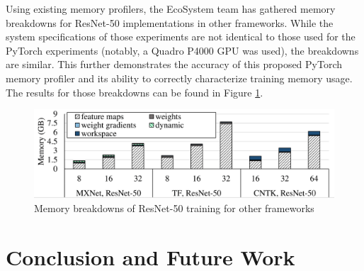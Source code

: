\documentclass[12pt,letterpaper]{article}
\begin{document}
Using existing memory profilers, the EcoSystem team has gathered memory breakdowns for ResNet-50 implementations in other frameworks. While the system specifications of those experiments are not identical to those used for the PyTorch experiments (notably, a Quadro P4000 GPU was used), the breakdowns are similar. This further demonstrates the accuracy of this proposed PyTorch memory profiler and its ability to correctly characterize training memory usage. The results for those breakdowns can be found in Figure \ref{fig:other_frameworks_resnet}.

\begin{figure}[H]
\centering
\includegraphics[width=1.0\textwidth]{ecosystem_resnet_other_frameworks_bar_graph.PNG}
\captionsetup{width=0.8\linewidth}
\caption{Memory breakdowns of ResNet-50 training for other frameworks \cite{tbd_benchmarks}}
\label{fig:other_frameworks_resnet}
\end{figure}


\section{Conclusion and Future Work}
\label{conclusion}
\end{document}
